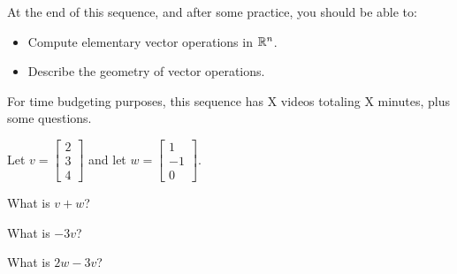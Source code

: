 







At the end of this sequence, and after some practice, you should be able to:

\begin{itemize}
\item Compute elementary vector operations in $\mathbb R^n$.  
\item Describe the geometry of vector operations.
\end{itemize}


For time budgeting purposes, this sequence has X videos totaling X minutes, 
plus some questions.  




\endedxtext

\endedxvertical









Let $v = \left[\begin{array}{c} 2 \\ 3  \\ 4 \end{array} \right]$ and let 
$w = \left[\begin{array}{c} 1 \\ -1  \\ 0 \end{array} \right].$


What is $v+w$?  








What is $-3v$?  



What is $2w-3v$?  





